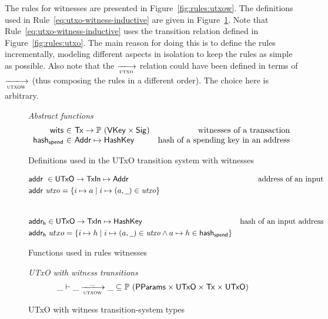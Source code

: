 The rules for witnesses are presented in Figure~\ref{fig:rules:utxow}.
The definitions used in Rule~\ref{eq:utxo-witness-inductive} are given in
Figure~\ref{fig:defs:utxow}. Note that
Rule~\ref{eq:utxo-witness-inductive} uses the transition relation defined in
Figure~\ref{fig:rules:utxo}. The main reason for doing this is to define
the rules incrementally, modeling different aspects in isolation to keep the
rules as simple as possible. Also note that the $\trans{utxo}{}$ relation could
have been defined in terms of $\trans{utxow}{}$ (thus composing the rules in a
different order). The choice here is arbitrary.

\begin{figure}[htb]
  \emph{Abstract functions}
  \begin{equation*}
    \begin{array}{r@{~\in~}lr}
      \fun{wits} & \Tx \to \powerset{(\VKey \times \Sig)}
      & \text{witnesses of a transaction}\\
      \fun{hash_{spend}} & \Addr \mapsto \HashKey
      & \text{hash of a spending key in an address}\\
    \end{array}
  \end{equation*}
  \caption{Definitions used in the UTxO transition system with witnesses}
  \label{fig:defs:utxow}
\end{figure}

\begin{figure}[htb]
  \begin{align*}
    & \addr{}{} \in \UTxO \to \TxIn \mapsto \Addr & \text{address of an input}\\
    & \addr{utxo} = \{ i \mapsto a \mid i \mapsto (a, \wcard) \in \var{utxo} \} \\
    \nextdef
    & \fun{addr_h} \in \UTxO \to \TxIn \mapsto \HashKey & \text{hash of an input address}\\
    & \fun{addr_h}~utxo = \{ i \mapsto h \mid i \mapsto (a, \wcard) \in \var{utxo}
      \wedge a \mapsto h \in \fun{hash_{spend}} \}
  \end{align*}
  \caption{Functions used in rules witnesses}
  \label{fig:derived-defs:utxow}
\end{figure}

\begin{figure}
  \emph{UTxO with witness transitions}
  \begin{equation*}
    \var{\_} \vdash
    \var{\_} \trans{utxow}{\_} \var{\_}
    \subseteq \powerset (\PPMMap \times \UTxO \times \Tx \times \UTxO)
  \end{equation*}
  \caption{UTxO with witness transition-system types}
  \label{fig:ts-types:utxow}
\end{figure}

